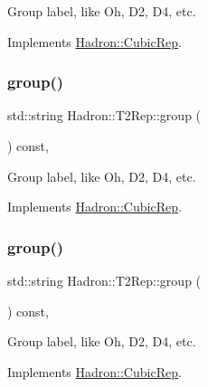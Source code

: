 Group label, like Oh, D2, D4, etc. 

Implements \mbox{\hyperlink{structHadron_1_1CubicRep_a0748f11ec87f387062c8e8981339a29c}{Hadron\+::\+Cubic\+Rep}}.

\mbox{\label{structHadron_1_1T2Rep_a88eec3e9213490d2f0df4e27ecb97072}} 
\subsubsection{\texorpdfstring{group()}{group()}\hspace{0.1cm}{\footnotesize\ttfamily [2/3]}}
{\footnotesize\ttfamily std\+::string Hadron\+::\+T2\+Rep\+::group (\begin{DoxyParamCaption}{ }\end{DoxyParamCaption}) const\hspace{0.3cm}{\ttfamily [inline]}, {\ttfamily [virtual]}}

Group label, like Oh, D2, D4, etc. 

Implements \mbox{\hyperlink{structHadron_1_1CubicRep_a0748f11ec87f387062c8e8981339a29c}{Hadron\+::\+Cubic\+Rep}}.

\mbox{\label{structHadron_1_1T2Rep_a88eec3e9213490d2f0df4e27ecb97072}} 
\subsubsection{\texorpdfstring{group()}{group()}\hspace{0.1cm}{\footnotesize\ttfamily [3/3]}}
{\footnotesize\ttfamily std\+::string Hadron\+::\+T2\+Rep\+::group (\begin{DoxyParamCaption}{ }\end{DoxyParamCaption}) const\hspace{0.3cm}{\ttfamily [inline]}, {\ttfamily [virtual]}}

Group label, like Oh, D2, D4, etc. 

Implements \mbox{\hyperlink{structHadron_1_1CubicRep_a0748f11ec87f387062c8e8981339a29c}{Hadron\+::\+Cubic\+Rep}}.

\mbox{\label{structHadron_1_1T2Rep_aa8debf402fc347d71fe8ba6745578c0d}} 
